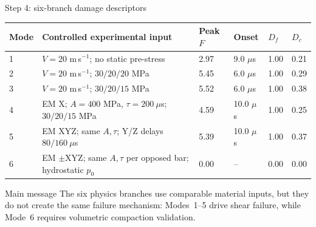 \documentclass[11pt,aspectratio=169]{beamer}
\newcommand{\toprule}{\hline}
\newcommand{\midrule}{\hline}
\newcommand{\bottomrule}{\hline}
\begin{document}
\begin{frame}{Step 4: six-branch damage descriptors}
  \tiny
  \begin{tabular}{@{}p{}p{}p{}p{}p{}p{}@{}}
    \toprule
    \textbf{Mode} & \textbf{Controlled experimental input} & \textbf{Peak $F$} & \textbf{Onset} & \textbf{$D_f$} & \textbf{$D_c$} \\
    \midrule
    1 & $V=20$ m\,s$^{-1}$; no static pre-stress & 2.97 & 9.0 $\mu$s & 1.00 & 0.21 \\
    2 & $V=20$ m\,s$^{-1}$; $30/20/20$ MPa & 5.45 & 6.0 $\mu$s & 1.00 & 0.29 \\
    3 & $V=20$ m\,s$^{-1}$; $30/20/15$ MPa & 5.52 & 6.0 $\mu$s & 1.00 & 0.38 \\
    4 & EM X; $A=400$ MPa, $\tau=200~\mu$s; $30/20/15$ MPa & 4.59 & 10.0 $\mu$s & 1.00 & 0.25 \\
    5 & EM XYZ; same $A,\tau$; Y/Z delays $80/160~\mu$s & 5.39 & 10.0 $\mu$s & 1.00 & 0.37 \\
    6 & EM $\pm$XYZ; same $A,\tau$ per opposed bar; hydrostatic $p_0$ & 0.00 & -- & 0.00 & 0.00 \\
    \bottomrule
  \end{tabular}
  \vspace{0.22cm}
  \begin{block}{Main message}
    The six physics branches use comparable material inputs, but they do not
    create the same failure mechanism: Modes~1--5 drive shear failure, while Mode~6
    requires volumetric compaction validation.
  \end{block}
\end{frame}
\end{document}
